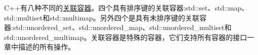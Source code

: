 
C++有八种不同的\href{http://en.cppreference.com/w/cpp/container}{关联容器}。四个具有排序键的关联容器:std::set、std::map、std::multiset和std::multimap。另外四个是具有未排序键的关联容器:std::unordered\_set、std::unordered\_map、std::unordered\_multiset和std::unordered\_multimap。关联容器是特殊的容器，它们支持所有容器的接口一章中描述的所有操作。